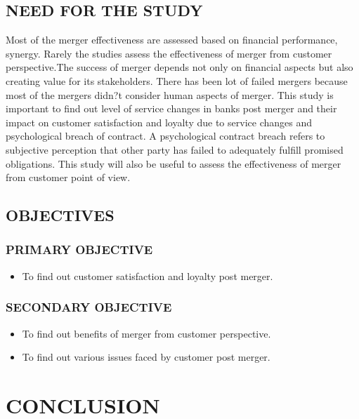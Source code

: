 \documentclass[a4paper, 14pt]{article}
\begin{document}
{\subsection{NEED FOR THE STUDY}
\par Most of the merger effectiveness are assessed based on financial performance, synergy. Rarely the studies assess the effectiveness of merger from customer perspective.The success of merger depends not only on financial aspects but also creating value for its stakeholders. There has been lot of failed mergers because most of the mergers didn?t consider human aspects of merger. This study is important to find out level of service changes in banks post merger and their impact on customer satisfaction and loyalty due to service changes and psychological breach of contract. A psychological contract breach refers to subjective perception that other party has failed to adequately fulfill promised obligations. This study will also be useful to assess the effectiveness of merger from customer point of view.

\subsection{OBJECTIVES}
\subsubsection{PRIMARY OBJECTIVE}
\begin{itemize}
\item To find out customer satisfaction and loyalty post merger.
\end{itemize}
\subsubsection{SECONDARY OBJECTIVE}
\begin{itemize}
\item To find out benefits of merger from customer perspective.
\item To find out various issues faced by customer post merger.
\end{itemize}
\newpage
\section{CONCLUSION}

\newpage
}
\end{document}

